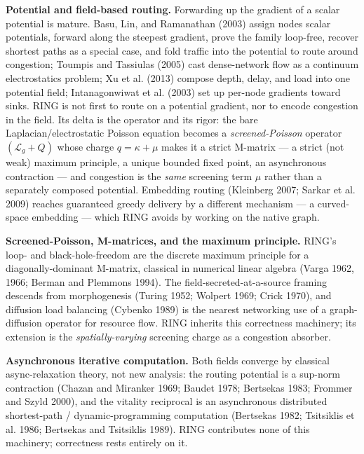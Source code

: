 \documentclass[11pt]{article}
\theoremstyle{plain}
\numberwithin{equation}{section}
\begin{document}
\textbf{Potential and field-based routing.} Forwarding up the gradient of a scalar potential is mature. Basu, Lin, and Ramanathan (2003) assign nodes scalar potentials, forward along the steepest gradient, prove the family loop-free, recover shortest paths as a special case, and fold traffic into the potential to route around congestion; Toumpis and Tassiulas (2005) cast dense-network flow as a continuum electrostatics problem; Xu et al. (2013) compose depth, delay, and load into one potential field; Intanagonwiwat et al. (2003) set up per-node gradients toward sinks. RING is not first to route on a potential gradient, nor to encode congestion in the field. Its delta is the operator and its rigor: the bare Laplacian/electrostatic Poisson equation becomes a \emph{screened-Poisson} operator $(\mathcal{L}_g+Q)$ whose charge $q=\kappa+\mu$ makes it a strict M-matrix — a strict (not weak) maximum principle, a unique bounded fixed point, an asynchronous contraction — and congestion is the \emph{same} screening term $\mu$ rather than a separately composed potential. Embedding routing (Kleinberg 2007; Sarkar et al. 2009) reaches guaranteed greedy delivery by a different mechanism — a curved-space embedding — which RING avoids by working on the native graph.

\textbf{Screened-Poisson, M-matrices, and the maximum principle.} RING's loop- and black-hole-freedom are the discrete maximum principle for a diagonally-dominant M-matrix, classical in numerical linear algebra (Varga 1962, 1966; Berman and Plemmons 1994). The field-secreted-at-a-source framing descends from morphogenesis (Turing 1952; Wolpert 1969; Crick 1970), and diffusion load balancing (Cybenko 1989) is the nearest networking use of a graph-diffusion operator for resource flow. RING inherits this correctness machinery; its extension is the \emph{spatially-varying} screening charge as a congestion absorber.

\textbf{Asynchronous iterative computation.} Both fields converge by classical async-relaxation theory, not new analysis: the routing potential is a sup-norm contraction (Chazan and Miranker 1969; Baudet 1978; Bertsekas 1983; Frommer and Szyld 2000), and the vitality reciprocal is an asynchronous distributed shortest-path / dynamic-programming computation (Bertsekas 1982; Tsitsiklis et al. 1986; Bertsekas and Tsitsiklis 1989). RING contributes none of this machinery; correctness rests entirely on it.
\end{document}
